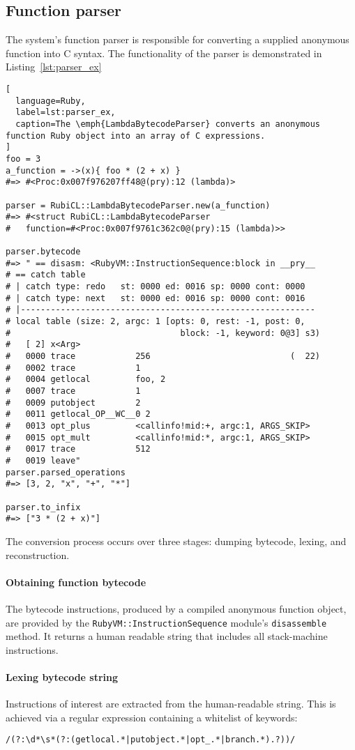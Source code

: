 \subsection{Function parser}
The system's function parser is responsible for converting a supplied anonymous function into C syntax. The functionality of the parser is demonstrated in Listing~\ref{lst:parser_ex}
\begin{lstlisting}[
  language=Ruby,
  label=lst:parser_ex,
  caption=The \emph{LambdaBytecodeParser} converts an anonymous function Ruby object into an array of C expressions.
]
foo = 3
a_function = ->(x){ foo * (2 + x) }
#=> #<Proc:0x007f976207ff48@(pry):12 (lambda)>

parser = RubiCL::LambdaBytecodeParser.new(a_function)
#=> #<struct RubiCL::LambdaBytecodeParser
#   function=#<Proc:0x007f9761c362c0@(pry):15 (lambda)>>

parser.bytecode
#=> " == disasm: <RubyVM::InstructionSequence:block in __pry__
# == catch table
# | catch type: redo   st: 0000 ed: 0016 sp: 0000 cont: 0000
# | catch type: next   st: 0000 ed: 0016 sp: 0000 cont: 0016
# |-----------------------------------------------------------
# local table (size: 2, argc: 1 [opts: 0, rest: -1, post: 0,
#                                  block: -1, keyword: 0@3] s3)
#   [ 2] x<Arg>     
#   0000 trace            256                            (  22)
#   0002 trace            1
#   0004 getlocal         foo, 2
#   0007 trace            1
#   0009 putobject        2
#   0011 getlocal_OP__WC__0 2
#   0013 opt_plus         <callinfo!mid:+, argc:1, ARGS_SKIP>
#   0015 opt_mult         <callinfo!mid:*, argc:1, ARGS_SKIP>
#   0017 trace            512
#   0019 leave"
parser.parsed_operations
#=> [3, 2, "x", "+", "*"]

parser.to_infix
#=> ["3 * (2 + x)"]
\end{lstlisting}

The conversion process occurs over three stages: dumping bytecode, lexing, and reconstruction.

\paragraph*{Obtaining function bytecode}
The bytecode instructions, produced by a compiled anonymous function object, are provided by the \verb|RubyVM::InstructionSequence| module's \verb|disassemble| method.
It returns a human readable string that includes all stack-machine instructions.

\paragraph*{Lexing bytecode string}
Instructions of interest are extracted from the human-readable string. This is achieved via a regular expression containing a whitelist of keywords:
\begin{verbatim}
/(?:\d*\s*(?:(getlocal.*|putobject.*|opt_.*|branch.*).?))/
\end{verbatim}


